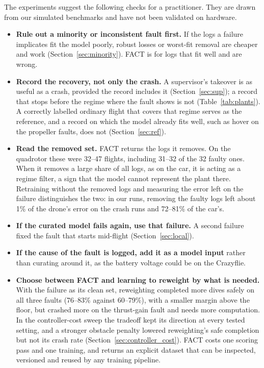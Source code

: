 \documentclass[preprint,12pt]{elsarticle}
\newcommand{\method}{FACT}
\begin{document}
The experiments suggest the following checks for a practitioner. They are drawn from our simulated benchmarks and have not been validated on hardware.
\begin{itemize}
\item \textbf{Rule out a minority or inconsistent fault first.} If the logs a failure implicates fit the model poorly, robust losses or worst-fit removal are cheaper and work (Section~\ref{sec:minority}). \method{} is for logs that fit well and are wrong.
\item \textbf{Record the recovery, not only the crash.} A supervisor's takeover is as useful as a crash, provided the record includes it (Section~\ref{sec:sup}); a record that stops before the regime where the fault shows is not (Table~\ref{tab:plants}). A correctly labelled ordinary flight that covers that regime serves as the reference, and a record on which the model already fits well, such as hover on the propeller faults, does not (Section~\ref{sec:ref}).
\item \textbf{Read the removed set.} \method{} returns the logs it removes. On the quadrotor these were 32--47 flights, including 31--32 of the 32 faulty ones. When it removes a large share of all logs, as on the car, it is acting as a regime filter, a sign that the model cannot represent the plant there. Retraining without the removed logs and measuring the error left on the failure distinguishes the two: in our runs, removing the faulty logs left about 1\% of the drone's error on the crash runs and 72--81\% of the car's.
\item \textbf{If the curated model fails again, use that failure.} A second failure fixed the fault that starts mid-flight (Section~\ref{sec:local}).
\item \textbf{If the cause of the fault is logged, add it as a model input} rather than curating around it, as the battery voltage could be on the Crazyflie.
\item \textbf{Choose between \method{} and learning to reweight by what is needed.} With the failure as its clean set, reweighting completed more dives safely on all three faults (76--83\% against 60--79\%), with a smaller margin above the floor, but crashed more on the thrust-gain fault and needs more computation. In the controller-cost sweep the tradeoff kept its direction at every tested setting, and a stronger obstacle penalty lowered reweighting's safe completion but not its crash rate (Section~\ref{sec:controller_cost}). \method{} costs one scoring pass and one training, and returns an explicit dataset that can be inspected, versioned and reused by any training pipeline.
\end{itemize}
\end{document}
